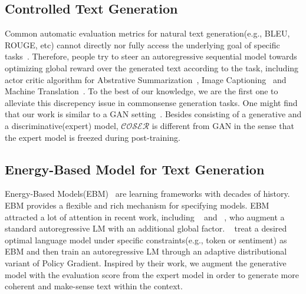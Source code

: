\subsection{Controlled Text Generation}

Common automatic evaluation metrics for natural text generation(e.g., BLEU, ROUGE, etc) cannot 
directly nor fully access the underlying goal of specific tasks~\citep{DBLP:journals/corr/BengioVJS15}.
Therefore, people try to steer an autoregressive sequential model towards optimizing global reward over 
the generated text according to the task, including actor critic algorithm for Abstrative Summarization~\citep{DBLP:journals/corr/BahdanauBXGLPCB16},
Image Captioning~\citep{DBLP:journals/corr/LiuZYG016} and Machine Translation~\citep{DBLP:journals/corr/RanzatoCAZ15}.
To the best of our knowledge, we are the first one to alleviate this discrepency issue in commonsense
generation tasks. One might find that our work is similar to a GAN setting~\citep{DBLP:journals/corr/YuZWY16,DBLP:conf/icml/ZhangGFCHSC17}.
Besides consisting of a generative and a discriminative(expert) model, $\mathcal{COSER}$ is different from GAN
in the sense that the expert model is freezed during post-training.

\subsection{Energy-Based Model for Text Generation}

Energy-Based Models(EBM)~\citep{hintonebm,LeCun06atutorial,DBLP:journals/corr/RanzatoCAZ15,DBLP:conf/iclr/DengBOSR20}
are learning frameworks with decades of history. EBM provides a flexible and rich mechanism for specifying
models. EBM attracted a lot of attention in recent work, including
~\citet{DBLP:journals/corr/abs-1909-07063} and ~\citet{DBLP:conf/iclr/DengBOSR20}, who augment a standard
autoregressive LM with an additional global factor. ~\citet{dpg} treat a desired optimal language model under
specific constraints(e.g., token or sentiment) as EBM and then train an autoregressive LM through an adaptive
distributional variant of Policy Gradient. Inspired by their work, we augment the generative model with the
evaluation score from the expert model in order to generate more coherent and make-sense text within the context.
